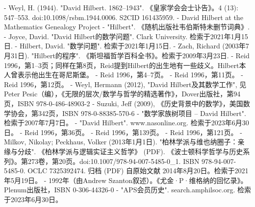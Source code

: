 - Weyl, H. (1944). "David Hilbert. 1862–1943". 《皇家学会会士讣告》。4 (13): 547–553. doi:10.1098/rsbm.1944.0006. S2CID 161435959.
- David Hilbert at the Mathematics Genealogy Project
- "Hilbert". 《随机出版社韦伯斯特未删节词典》.
- Joyce, David. "David Hilbert的数学问题". Clark University. 检索于2021年1月15日.
- Hilbert, David. "数学问题". 检索于2021年1月15日.
- Zach, Richard (2003年7月31日). "Hilbert的程序". 《斯坦福哲学百科全书》。检索于2009年3月23日.
- Reid 1996，第1–3页；同样在第8页，Reid提到Hilbert的出生地有一些歧义。Hilbert本人曾表示他出生在哥尼斯堡。
- Reid 1996，第4–7页。
- Reid 1996，第11页。
- Reid 1996，第12页。
- Weyl, Hermann (2012), "David Hilbert及其数学工作", 见Peter Pesic（编），《无限的层次/数学与哲学的精选著作》，Dover出版社，第94页，ISBN 978-0-486-48903-2
- Suzuki, Jeff (2009), 《历史背景中的数学》，美国数学协会，第342页，ISBN 978-0-88385-570-6
- "数学家族树项目 – David Hilbert". 检索于2007年7月7日。
- "David Hilbert". www.nasonline.org. 检索于2023年6月30日。
- Reid 1996，第36页。
- Reid 1996，第139页。
- Reid 1996，第121页。
- Milkov, Nikolay; Peckhaus, Volker (2013年1月1日). "柏林学派与维也纳圈子：亲缘与分歧". 《柏林学派与逻辑实证主义哲学》 (PDF). 《波士顿科学哲学与历史系列》。第273卷，第20页。doi:10.1007/978-94-007-5485-0_1. ISBN 978-94-007-5485-0. OCLC 7325392474. 归档 (PDF) 自原始文献 2014年8月20日。检索于2021年5月19日。
- 1992年（由Andrew Szanton叙述）。《尤金·P·维格纳的回忆录》。Plenum出版社，ISBN 0-306-44326-0
- "APS会员历史". search.amphilsoc.org. 检索于2023年6月30日。